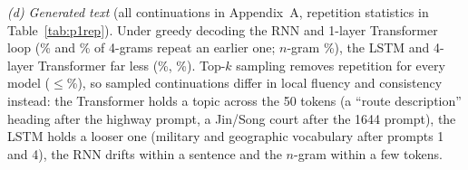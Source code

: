 \documentclass[10pt,a4paper]{article}
\begin{document}
\emph{(d) Generated text} (all continuations in Appendix~A, repetition statistics in Table~\ref{tab:p1rep}). Under greedy decoding the RNN and 1-layer Transformer loop (\repGreedyRNN\% and \repGreedyTransformerOne\% of 4-grams repeat an earlier one; $n$-gram \repGreedyNgram\%), the LSTM and 4-layer Transformer far less (\repGreedyLSTM\%, \repGreedyTransformer\%). Top-$k$ sampling removes repetition for every model ($\le$\repTopkTransformerOne\%), so sampled continuations differ in local fluency and consistency instead: the Transformer holds a topic across the 50 tokens (a ``route description'' heading after the highway prompt, a Jin/Song court after the 1644 prompt), the LSTM holds a looser one (military and geographic vocabulary after prompts 1 and 4), the RNN drifts within a sentence and the $n$-gram within a few tokens.
\end{document}
